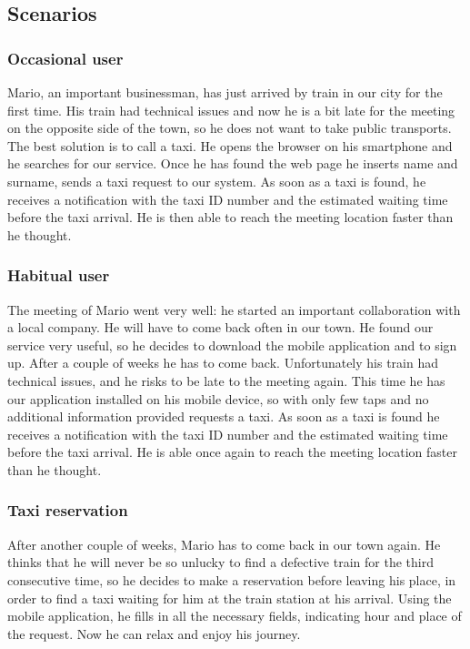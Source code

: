 \subsection{Scenarios}
\subsubsection{Occasional user}
Mario, an important businessman, has just arrived by train in our city for the first time.
His train had technical issues and now he is a bit late for the meeting on 
the opposite side of the town, so he does not want to take public transports.
The best solution is to call a taxi.
He opens the browser on his smartphone and he searches for our service. Once he has found the web page he inserts name and surname, sends a taxi request
to our system. As soon as a taxi is found, he receives a notification with the taxi ID number and the estimated
waiting time before the taxi arrival. He is then able to reach the meeting location faster than he thought.
\subsubsection{Habitual user}
The meeting of Mario went very well: he started an important collaboration with a local
company. He will have to come back often in our town. He found our service very useful, so
he decides to download the mobile application and to sign up. After a couple of weeks he has to
come back. Unfortunately his train had technical issues, and he risks to be late to the
meeting again. This time he has our application installed on his mobile device, so with only
few taps and no additional information provided requests a taxi. As soon as a taxi is found he receives
a notification with the taxi ID number and the estimated waiting time before the taxi arrival.
He is able once again to reach the meeting location faster than he thought.
\subsubsection{Taxi reservation}
After another couple of weeks, Mario has to come back in our town again. He thinks that he 
will never be so unlucky to find a defective train for the third consecutive time,
so he decides to make a reservation before leaving his place, in order to find a taxi waiting for him
at the train station at his arrival. Using the mobile application, he fills in all the
necessary fields, indicating hour and place of the request.
Now he can relax and enjoy his journey.
